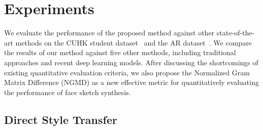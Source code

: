 \documentclass[10pt,twocolumn,letterpaper]{article}
\begin{document}
\section{Experiments}

We evaluate the performance of the proposed method against other state-of-the-art methods on the CUHK student dataset~\cite{wang2009face} and the AR dataset~\cite{martinez1998r}. We compare the results of our method against five other methods, including traditional approaches and recent deep learning models. After discussing the shortcomings of existing quantitative evaluation criteria, we also propose the Normalized Gram Matrix Difference (NGMD) as a new effective metric for quantitatively evaluating the performance of face sketch synthesis.

\subsection{Direct Style Transfer} \label{subsec:style_transfer}
\end{document}
